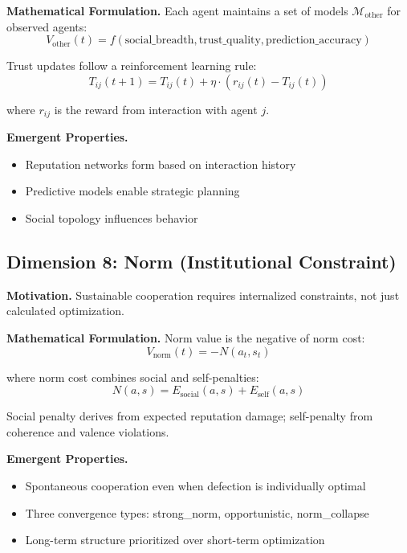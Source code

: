 \documentclass{article}
\begin{document}
\textbf{Mathematical Formulation.}
Each agent maintains a set of models $\mathcal{M}_{\text{other}}$ for observed agents:
\begin{equation}
    V_{\text{other}}(t) = f(\text{social\_breadth}, \text{trust\_quality}, \text{prediction\_accuracy})
\end{equation}

Trust updates follow a reinforcement learning rule:
\begin{equation}
    T_{ij}(t+1) = T_{ij}(t) + \eta \cdot (r_{ij}(t) - T_{ij}(t))
\end{equation}

where $r_{ij}$ is the reward from interaction with agent $j$.

\textbf{Emergent Properties.}
\begin{itemize}
    \item Reputation networks form based on interaction history
    \item Predictive models enable strategic planning
    \item Social topology influences behavior
\end{itemize}

\subsection{Dimension 8: Norm (Institutional Constraint)}

\textbf{Motivation.} Sustainable cooperation requires internalized constraints, not just calculated optimization.

\textbf{Mathematical Formulation.}
Norm value is the negative of norm cost:
\begin{equation}
    V_{\text{norm}}(t) = -N(a_t, s_t)
\end{equation}

where norm cost combines social and self-penalties:
\begin{equation}
    N(a, s) = E_{\text{social}}(a, s) + E_{\text{self}}(a, s)
\end{equation}

Social penalty derives from expected reputation damage; self-penalty from coherence and valence violations.

\textbf{Emergent Properties.}
\begin{itemize}
    \item Spontaneous cooperation even when defection is individually optimal
    \item Three convergence types: strong\_norm, opportunistic, norm\_collapse
    \item Long-term structure prioritized over short-term optimization
\end{itemize}
\end{document}
